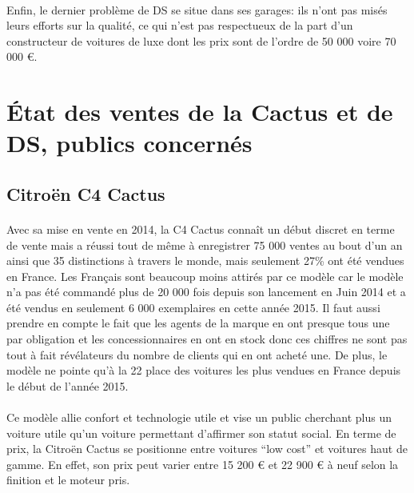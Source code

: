 \documentclass[12pt]{article}\usepackage[]{graphicx}\usepackage[]{color}
\begin{document}
\paragraph{} Enfin, le dernier problème de DS se situe dans ses garages: ils
n'ont pas misés leurs efforts sur la qualité, ce qui n'est pas respectueux de
la part d'un constructeur de voitures de luxe dont les prix sont de l'ordre de
50 000 voire 70 000 €.

\section{État des ventes de la Cactus et de DS, publics concernés}

\subsection{Citroën C4 Cactus}

\paragraph{} Avec sa mise en vente en 2014, la C4 Cactus connaît un début
discret en terme de vente mais a réussi tout de même à enregistrer 75 000
ventes au bout d'un an ainsi que 35 distinctions à travers le
monde\cite{communique}, mais seulement 27\% ont été vendues en France. Les
Français sont beaucoup moins attirés par ce modèle car le modèle n'a pas été
commandé plus de 20 000 fois depuis son lancement en Juin 2014 et a été vendus
en seulement 6 000 exemplaires en cette année 2015. Il faut aussi prendre en
compte le fait que les agents de la marque en ont presque tous une par
obligation et les concessionnaires en ont en stock donc ces chiffres ne sont
pas tout à fait révélateurs du nombre de clients qui en ont acheté une. De
plus, le modèle ne pointe qu'à la 22\ieme{} place des voitures les plus vendues
en France depuis le début de l'année 2015.

\paragraph{} Ce modèle allie confort et technologie utile et vise un public
cherchant plus un voiture utile qu'un voiture permettant d'affirmer son statut
social. En terme de prix, la Citroën Cactus se positionne entre voitures ``low
cost'' et voitures haut de gamme. En effet, son prix peut varier entre 15 200 €
et 22 900 € à neuf selon la finition et le moteur pris\cite{banquette}.
\end{document}
